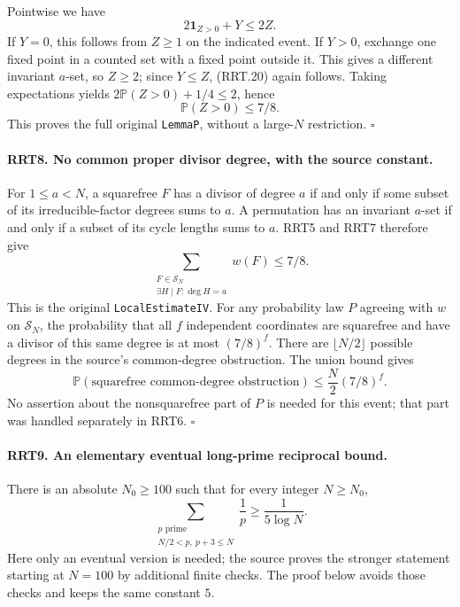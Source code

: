 \documentclass[11pt,a4paper]{article}
\numberwithin{equation}{section}
\theoremstyle{remark}\newtheorem{remark}[theorem]{Remark}
\begin{document}
Pointwise we have
\[
                 2\mathbf1_{Z>0}+Y\le2Z.
 \tag{RRT.20}
\]
If $Y=0$, this follows from $Z\ge1$ on the indicated event.
If $Y>0$, exchange one fixed point in a counted set with a fixed
point outside it.  This gives a different invariant $a$-set,
so $Z\ge2$; since $Y\le Z$, (RRT.20) again follows.
Taking expectations yields
$2\mathbb P(Z>0)+1/4\le2$, hence
\[
                       \mathbb P(Z>0)\le7/8.
 \tag{RRT.21}
\]
This proves the full original \texttt{Lemma\allowbreak P}, without a
large-$N$ restriction.
\hfill$\square$

\paragraph{RRT8. No common proper divisor degree, with the source constant.}
\label{claim:RRT8}
For $1\le a<N$, a squarefree $F$ has a divisor of degree $a$
if and only if some subset of its irreducible-factor degrees
sums to $a$.  A permutation has an invariant $a$-set if and
only if a subset of its cycle lengths sums to $a$.
RRT5 and RRT7 therefore give
\[
           \sum_{\substack{F\in\mathcal S_N\\
                      \exists H\mid F:\deg H=a}}w(F)\le7/8.
 \tag{RRT.22}
\]
This is the original \texttt{Local\allowbreak Estimate\allowbreak IV}.  For any
probability law $P$ agreeing with $w$ on $\mathcal S_N$, the
probability that all $f$ independent coordinates are squarefree
and have a divisor of this same degree is at most $(7/8)^f$.
There are $\lfloor N/2\rfloor$ possible degrees in the
source's common-degree obstruction.  The union bound gives
\[
   \mathbb P(\text{squarefree common-degree obstruction})
                          \le\frac N2(7/8)^f.
 \tag{RRT.23}
\]
No assertion about the nonsquarefree part of $P$ is needed for
this event; that part was handled separately in RRT6.
\hfill$\square$

\paragraph{RRT9. An elementary eventual long-prime reciprocal bound.}
\label{claim:RRT9}
There is an absolute $N_0\ge100$ such that for every integer
$N\ge N_0$,
\[
       \sum_{\substack{p\text{ prime}\\N/2<p,\ p+3\le N}}
                           \frac1p\ge\frac1{5\log N}.
 \tag{RRT.24}
\]
Here only an eventual version is needed; the source proves the
stronger statement starting at $N=100$ by additional finite
checks.  The proof below avoids those checks and keeps the same
constant $5$.
\end{document}
